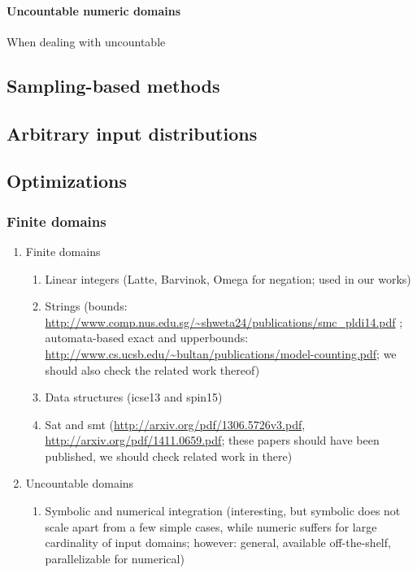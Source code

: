\paragraph{Uncountable numeric domains}
When dealing with uncountable



\subsection{Sampling-based methods}\label{sec:computingprobabilitiesSampling}

\subsection{Arbitrary input distributions}\label{sec:computingprobabilitiesInputDistributions}

\subsection{Optimizations}\label{sec:computingprobabilitiesOptimizations}



\subsubsection{Finite domains}\label{sec:exactComputationFinite}

	\begin{enumerate}
		\item Finite domains
			\begin{enumerate}
				\item Linear integers (Latte, Barvinok, Omega for negation; used in our works)
				\item Strings (bounds: \url{http://www.comp.nus.edu.sg/~shweta24/publications/smc\_pldi14.pdf} ; automata-based exact and upperbounds: \url{http://www.cs.ucsb.edu/~bultan/publications/model-counting.pdf}; we should also check the related work thereof)
				\item Data structures (icse13 and spin15)
				\item Sat and smt (\url{http://arxiv.org/pdf/1306.5726v3.pdf}, \url{http://arxiv.org/pdf/1411.0659.pdf}; these papers should have been published, we should check related work in there)
			\end{enumerate}
		
		\item Uncountable domains
			\begin{enumerate}
				\item Symbolic and numerical integration (interesting, but symbolic does not scale apart from a few simple cases, while numeric suffers for large cardinality of input domains; however: general, available off-the-shelf, parallelizable for numerical)
			\end{enumerate}
	\end{enumerate}


